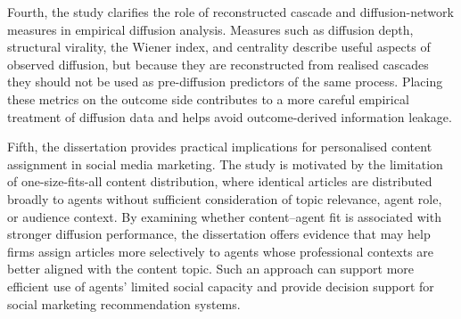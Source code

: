 Fourth, the study clarifies the role of reconstructed cascade and diffusion-network measures in empirical diffusion analysis. Measures such as diffusion depth, structural virality, the Wiener index, and centrality describe useful aspects of observed diffusion, but because they are reconstructed from realised cascades they should not be used as pre-diffusion predictors of the same process. Placing these metrics on the outcome side contributes to a more careful empirical treatment of diffusion data and helps avoid outcome-derived information leakage.

Fifth, the dissertation provides practical implications for personalised content assignment in social media marketing. The study is motivated by the limitation of one-size-fits-all content distribution, where identical articles are distributed broadly to agents without sufficient consideration of topic relevance, agent role, or audience context. By examining whether content–agent fit is associated with stronger diffusion performance, the dissertation offers evidence that may help firms assign articles more selectively to agents whose professional contexts are better aligned with the content topic. Such an approach can support more efficient use of agents' limited social capacity and provide decision support for social marketing recommendation systems.
